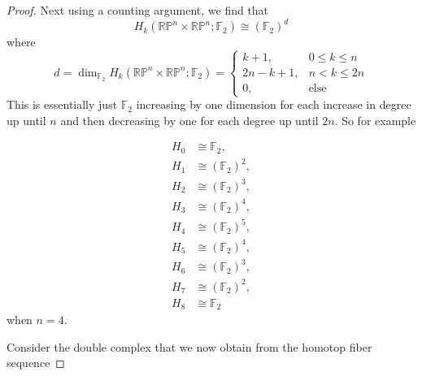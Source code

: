\documentclass[reqno]{amsart}
\theoremstyle{definition}
\theoremstyle{remark}
\begin{document}
\begin{proof}
Next using a counting argument, we find that
\[
H_k \left( \mathbb{R}\mathbb{P}^{n} \times 
\mathbb{R}\mathbb{P}^{n} ; \mathbb{F}_2\right) 
\cong \left( \mathbb{F}_2 \right)^{d}
\] 
where 
 \[
d = \dim_{\mathbb{F}_2}
H_k \left( \mathbb{R}\mathbb{P}^{n} \times 
\mathbb{R}\mathbb{P}^{n} ; \mathbb{F}_2\right) 
=
\begin{cases}
    k+1,& 0\le k \le n\\
    2n-k+1,& n < k \le 2n\\
    0,& \text{else}
\end{cases}
\] 
This is essentially just
$\mathbb{F}_2$ increasing by one dimension
for each increase in degree up until $n$ and then
decreasing by one for each degree up until $2n$. So for example

\[
\begin{aligned}
H_0 &\cong \mathbb{F}_2, \\
H_1 &\cong (\mathbb{F}_2)^2, \\
H_2 &\cong (\mathbb{F}_2)^3, \\
H_3 &\cong (\mathbb{F}_2)^4, \\
H_4 &\cong (\mathbb{F}_2)^5, \\
H_5 &\cong (\mathbb{F}_2)^4, \\
H_6 &\cong (\mathbb{F}_2)^3, \\
H_7 &\cong (\mathbb{F}_2)^2, \\
H_8 &\cong \mathbb{F}_2
\end{aligned}
\]
when $n = 4$.


Consider the double complex that we now obtain from the
homotop fiber sequence



\end{proof}
\end{document}
